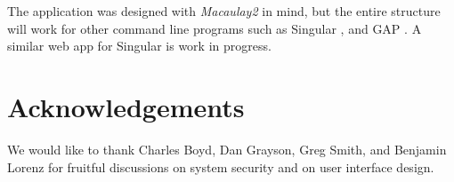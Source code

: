 \documentclass[twocolumn]{article}
\def\M2{{\it Macaulay2}}
\begin{document}
The application was designed with \M2 in mind, but
the entire structure will work for other command line programs such as Singular \cite{singular},
and GAP \cite{GAP4}. A similar web app for Singular is work in progress.

\section{Acknowledgements}

We would like to thank Charles Boyd, Dan Grayson, Greg Smith, and Benjamin Lorenz for
fruitful discussions on system security and on user interface design.



\end{document}
